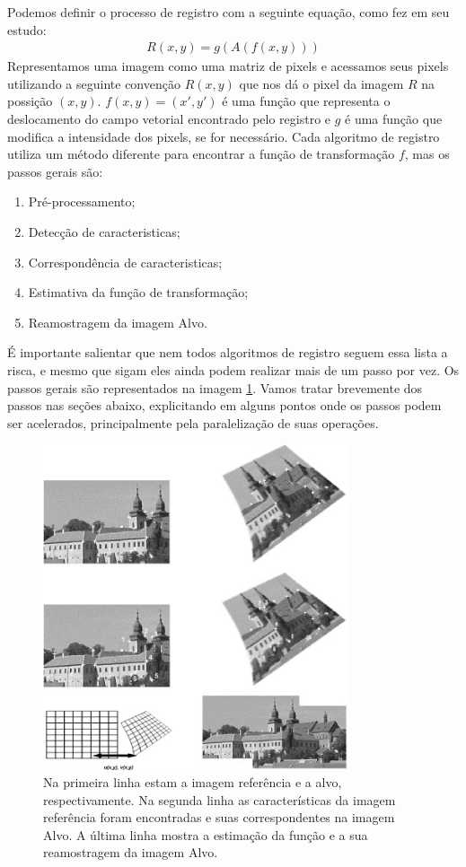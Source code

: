 Podemos definir o processo de registro com a seguinte equação, como \cite{brown1992survey} fez em seu estudo:
\begin{align}\label{eq:defregistro}
    R(x,y) = g(A(f(x,y)))
\end{align}
    Representamos uma imagem como uma matriz de pixels e acessamos seus pixels utilizando a seguinte convenção $R(x,y)$ 
que nos dá o pixel da imagem $R$ na possição $(x,y)$. $f(x,y) = (x',y')$ é uma função que representa o deslocamento do 
campo vetorial encontrado pelo registro e $g$ é uma função que modifica a intensidade dos pixels, se for necessário. 
Cada algoritmo de registro utiliza um método diferente para encontrar a função de transformação $f$, mas os passos gerais são:
\begin{enumerate}
    \item Pré-processamento;
    \item Detecção de caracteristicas;
    \item Correspondência de caracteristicas;
    \item Estimativa da função de transformação;
    \item Reamostragem da imagem Alvo.
\end{enumerate}
    É importante salientar que nem todos algoritmos de registro seguem essa lista a risca, e mesmo que sigam eles ainda
podem realizar mais de um passo por vez. Os passos gerais são representados na imagem \ref{fig:regExplicacao}. 
Vamos tratar brevemente dos passos nas seções abaixo, explicitando em alguns pontos onde os passos podem ser acelerados,
principalmente pela paralelização de suas operações.
\begin{figure}[H]
    \centering
    \includegraphics[width=0.8\textwidth]{figuras/regSteps.jpg}
    \caption{Na primeira linha estam a imagem referência e a alvo, respectivamente. Na segunda linha as características
da imagem referência foram encontradas e suas correspondentes na imagem Alvo. A última linha mostra a estimação da 
função e a sua reamostragem da imagem Alvo. \citep{zitova2003image}}
    \label{fig:regExplicacao}
\end{figure}

